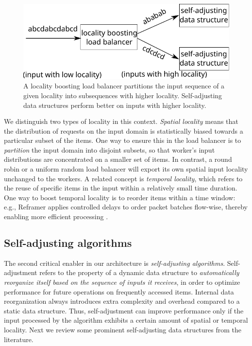 \begin{figure}
  \centering
  \includegraphics[width=.75\linewidth]{fig/schema.pdf}
  \caption{A locality boosting load balancer partitions the input sequence of a given locality into subsequences with higher locality. Self-adjusting data structures perform better on inputs with higher locality.}
  \label{fig:locality-boosting-lb}
\end{figure}

We distinguish two types of locality in this context. \emph{Spatial locality} means that the distribution of requests on the input domain is statistically biased towards a particular subset of the items. One way to ensure this in the load balancer is to \emph{partition} the input domain into disjoint subsets, so that worker's input distributions are concentrated on a smaller set of items. In contrast, a round robin or a uniform random load balancer will export its own spatial input locality unchanged to the workers. A related concept is \emph{temporal locality}, which refers to the reuse of specific items in the input within a relatively small time duration. One way to boost temporal locality is to reorder items within a time window: e.g., Reframer applies controlled delays to order packet batches flow-wise, thereby enabling more efficient processing \cite{276946,246322}.

\subsection{Self-adjusting algorithms}
\label{sec:sa-alg}

The second critical enabler in our architecture is \emph{self-adjusting algorithms}. Self-adjustment refers to the property of a dynamic data structure to \emph{automatically reorganize itself based on the sequence of inputs it receives}, in order to optimize performance for future operations on frequently accessed items. Internal data reorganization always introduces extra complexity and overhead compared to a static data structure. Thus, self-adjustment can improve performance only if the input processed by the algorithm exhibits a certain amount of spatial or temporal locality.  Next we review some prominent self-adjusting data structures from the literature. %

